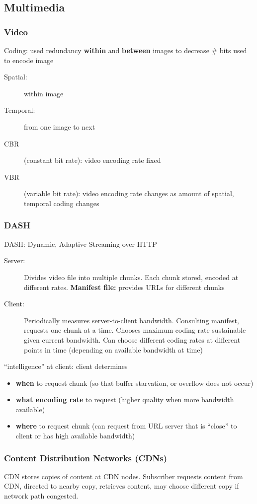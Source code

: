 \subsection{Multimedia}
\subsubsection{Video}
Coding: used redundancy \textbf{within} and \textbf{between} images to decrease \# bits used to encode image
\begin{description}
	\item[Spatial:] within image
	\item[Temporal:] from one image to next
	\item[CBR] (constant bit rate): video encoding rate fixed
	\item[VBR] (variable bit rate): video encoding rate changes as amount of spatial, temporal coding changes
\end{description}
\subsubsection{DASH}\label{sec:dash}
DASH: Dynamic, Adaptive Streaming over HTTP
\begin{description}
	\item[Server:] Divides video file into multiple chunks. Each chunk stored, encoded at different rates. \textbf{Manifest file:} provides URLs for different chunks
	\item[Client:] Periodically measures server-to-client bandwidth. Consulting manifest, requests one chunk at a time. Chooses maximum coding rate sustainable given current bandwidth. Can choose different coding rates at different points in time (depending on available bandwidth at time)
\end{description}
``intelligence'' at client: client determines
\begin{itemize}
	\item \textbf{when} to request chunk (so that buffer starvation, or overflow does not occur)
	\item \textbf{what encoding rate} to request (higher quality when more bandwidth available)
	\item \textbf{where} to request chunk (can request from URL server that is ``close'' to client or has high available bandwidth)
\end{itemize}
\subsubsection{Content Distribution Networks (CDNs)}
CDN stores copies of content at CDN nodes. Subscriber requests content from CDN, directed to nearby copy, retrieves content, may choose different copy if network path congested.
